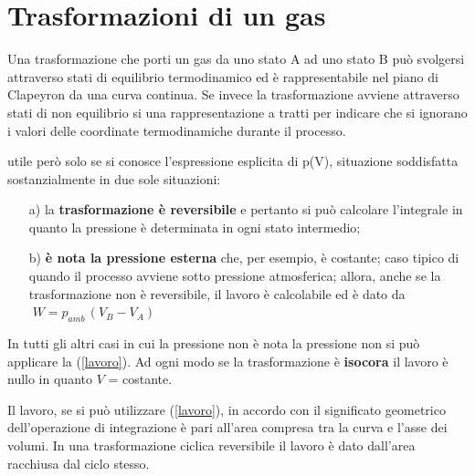 \documentclass[x11names]{report}
\begin{document}
	\section{Trasformazioni  di un gas}
	Una trasformazione che porti un gas da uno stato A ad uno stato B può svolgersi attraverso stati di equilibrio termodinamico ed è rappresentabile nel piano di Clapeyron da una curva continua. Se invece la trasformazione avviene attraverso stati di non equilibrio si una rappresentazione a tratti per indicare che si ignorano i valori delle coordinate termodinamiche durante il processo.
	
	
	
	utile però solo se si conosce l'espressione esplicita di p(V), situazione soddisfatta sostanzialmente in due sole situazioni: 
	\begin{itemize}
		\item[a)] la \textbf{trasformazione è reversibile} e pertanto si può calcolare l'integrale in quanto la pressione è determinata in ogni stato intermedio; 
		\item[b)] \textbf{è nota la pressione esterna} che, per esempio, è costante; caso tipico di quando il processo avviene sotto pressione atmosferica; allora, anche se la trasformazione non è reversibile, il lavoro è calcolabile ed è dato da  $\;W = p_{amb}\,(V_B - V_A)$
	\end{itemize}
	In tutti gli altri casi in cui la pressione non è nota la pressione non si può applicare la (\ref{lavoro}). 
	Ad ogni modo se la trasformazione è \textbf{isocora} il lavoro è nullo in quanto $V$ = costante. 
	
	
	Il lavoro, se si può utilizzare (\ref{lavoro}), in accordo con il significato geometrico dell'operazione di integrazione è pari all'area compresa tra la curva e l'asse dei volumi. In una trasformazione ciclica reversibile il lavoro è dato dall'area racchiusa dal ciclo stesso.
	
\end{document}
